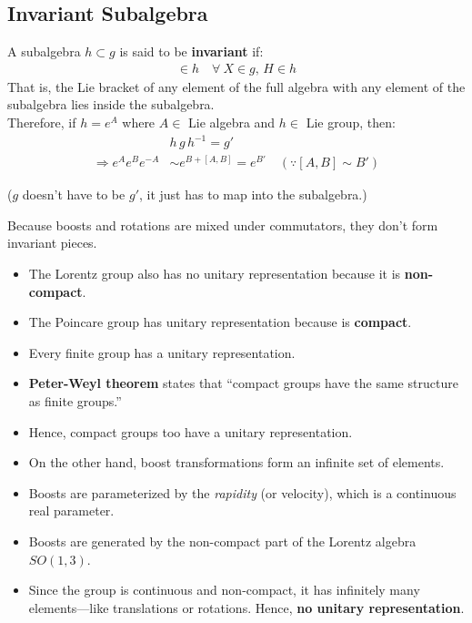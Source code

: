 \documentclass[14pt]{article} %
\begin{document}
\subsection*{Invariant Subalgebra}
A subalgebra $h \subset g$ is said to be \textbf{invariant} if:
\begin{align*}
[X,H] \in h \quad \forall~ X \in g, \, H \in h
\end{align*}
That is, the Lie bracket of any element of the full algebra with any element of the subalgebra lies inside the subalgebra.\\
Therefore, if $h = e^A$ where $A \in$ Lie algebra and $h \in$ Lie group, then:
\begin{align*}
&h\,g\,h^{-1} = g' \\
\Rightarrow e^A e^B e^{-A} &\sim e^{B+[A,B]} = e^{B'} \quad (\because [A,B] \sim B' )
\end{align*}
\begin{center}
    ($g$ doesn’t have to be $g'$, it just has to map into the subalgebra.)
\end{center}
Because boosts and rotations are mixed under commutators, they don’t form invariant pieces.
\begin{tcolorbox}[ title=Notes]
\begin{itemize}
    \item The Lorentz group also has no unitary representation because it is \textbf{non-compact}.
    \item The Poincare group has unitary representation because is \textbf{compact}.
    \item Every finite group has a unitary representation.
    \item \textbf{Peter-Weyl theorem} states that “compact groups have the same structure as finite groups.”
    \item Hence, compact groups too have a unitary representation.
    \item On the other hand, boost transformations form an infinite set of elements.
    \item Boosts are parameterized by the \textit{rapidity} (or velocity), which is a continuous real parameter.
    \item Boosts are generated by the non-compact part of the Lorentz algebra $SO(1,3)$.
    \item Since the group is continuous and non-compact, it has infinitely many elements—like translations or rotations. Hence, \textbf{no unitary representation}.
\end{itemize}
\end{tcolorbox}
\end{document}
